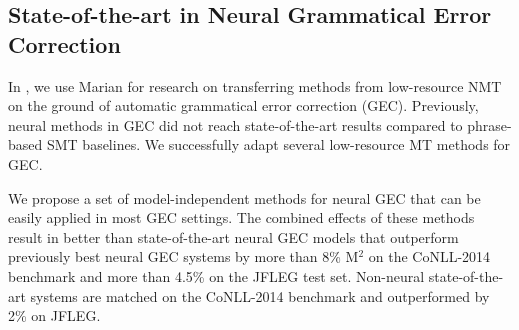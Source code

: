 \documentclass[11pt,a4paper]{article}
\begin{document}

  \subsection{State-of-the-art in Neural Grammatical Error Correction}

  In , we use Marian for research on transferring methods from low-resource NMT on the ground of automatic grammatical error correction (GEC).
  Previously, neural methods in GEC did not reach state-of-the-art results compared to phrase-based SMT baselines. We successfully adapt several low-resource MT methods for GEC.

  We propose a set of model-independent methods for neural GEC that can be easily applied in most GEC settings.
  The combined effects of these methods result in better than state-of-the-art neural GEC models that outperform previously best neural GEC systems by more than 8\% M$^2$ on the CoNLL-2014 benchmark and more than 4.5\% on the JFLEG test set. Non-neural state-of-the-art systems are matched on the CoNLL-2014 benchmark and outperformed by 2\% on JFLEG.
\end{document}
